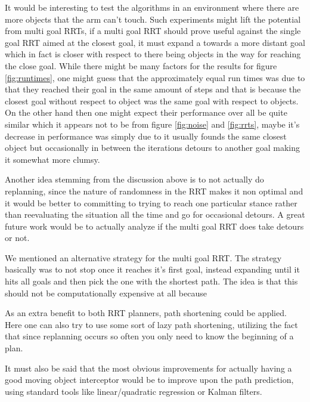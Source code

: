 \documentclass[letterpaper, 10 pt, conference]{ieeeconf}  %
\begin{document}
It would be interesting to test the algorithms in an environment where
there are more objects that the arm can't touch. Such experiments might
lift the potential from multi goal RRTs,  if a multi goal RRT should
prove useful against the single goal RRT aimed at the closest goal, it
must expand a towards a more distant goal which in fact is closer with
respect to there being objects in the way for reaching the close goal.
While there might be many factors for the results for figure
\ref{fig:runtimes}, one might guess that the approximately equal
run times was due to that they reached their goal in the same amount of
steps and that is because the closest goal without respect to object was
the same goal with respect to objects. On the other hand then one might
expect their performance over all be quite similar which it appears not
to be from figure \ref{fig:noise} and \ref{fig:rrts}, maybe it's
decrease in performance was simply due to it usually founds the same
closest object but occasionally in between the iterations detours to
another goal making it somewhat more clumsy.

Another idea stemming from the discussion above is to not actually do
replanning, since the nature of randomness in the RRT makes it non optimal
and it would be better to committing to trying to reach one particular
stance rather than reevaluating the situation all the time and go for
occasional detours. A great future work would be to actually analyze if
the multi goal RRT does take detours or not.

We mentioned an alternative strategy for the multi goal RRT.  The strategy
basically was to not stop once it reaches it's first goal, instead
expanding until it hits all goals and then pick the one with the
shortest path. The idea is that this should not be computationally
expensive at all because

As an extra benefit to both RRT planners, path shortening could be
applied. Here one can also try to use some sort of lazy path shortening,
utilizing the fact that since replanning occurs so often you only need
to know the beginning of a plan.

It must also be said that the most obvious improvements for actually
having a good moving object interceptor would be to improve upon the
path prediction, using standard tools like linear/quadratic regression
or Kalman filters.



\end{document}
